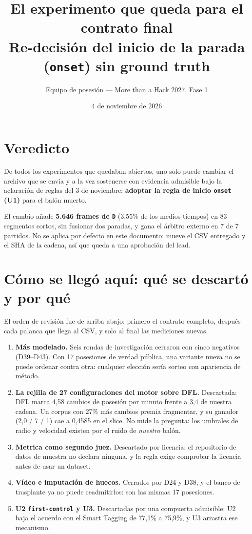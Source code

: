 \documentclass[11pt,a4paper]{article}
\title{El experimento que queda para el contrato final\\[2pt]
\large Re-decisión del inicio de la parada (\texttt{onset}) sin ground truth}
\author{Equipo de posesión --- More than a Hack 2027, Fase 1}
\date{4 de noviembre de 2026}
\newcommand{\code}[1]{\texttt{\small #1}}
\begin{document}
\maketitle

\section{Veredicto}

De todos los experimentos que quedaban abiertos, uno solo puede cambiar el archivo que se envía y
a la vez sostenerse con evidencia admisible bajo la aclaración de reglas del 3 de noviembre:
\textbf{adoptar la regla de inicio \texttt{onset} (U1)} para el balón muerto.

El cambio añade \textbf{5.646 frames de \code{D}} (3,55\% de los medios tiempos) en 83 segmentos
cortos, sin fusionar dos paradas, y gana el árbitro externo en 7 de 7 partidos. No se aplica por
defecto en este documento: mueve el CSV entregado y el SHA de la cadena, así que queda a una
aprobación del lead.

\section{Cómo se llegó aquí: qué se descartó y por qué}

El orden de revisión fue de arriba abajo: primero el contrato completo, después cada palanca que
llega al CSV, y solo al final las mediciones nuevas.

\begin{enumerate}[leftmargin=1.2em]
  \item \textbf{Más modelado.} Seis rondas de investigación cerraron con cinco negativos
        (D39--D43). Con 17 posesiones de verdad pública, una variante nueva no se puede ordenar
        contra otra: cualquier elección sería sorteo con apariencia de método.
  \item \textbf{La rejilla de 27 configuraciones del motor sobre DFL.} Descartada: DFL marca 4,58
        cambios de posesión por minuto frente a 3,4 de nuestra cadena. Un corpus con 27\% más
        cambios premia fragmentar, y su ganador (2,0 / 7 / 1) cae a 0,4585 en el slice. No mide la
        pregunta: los umbrales de radio y velocidad existen por el ruido de \emph{nuestro} balón.
  \item \textbf{Metrica como segundo juez.} Descartado por licencia: el repositorio de datos de
        muestra no declara ninguna, y la regla exige comprobar la licencia antes de usar un dataset.
  \item \textbf{Vídeo e imputación de huecos.} Cerrados por D24 y D38, y el banco de trasplante ya
        no puede readmitirlos: son las mismas 17 posesiones.
  \item \textbf{U2 \texttt{first-control} y U3.} Descartadas por una compuerta admisible: U2 baja
        el acuerdo con el Smart Tagging de 77,1\% a 75,9\%, y U3 arrastra ese mecanismo.
\end{enumerate}
\end{document}
